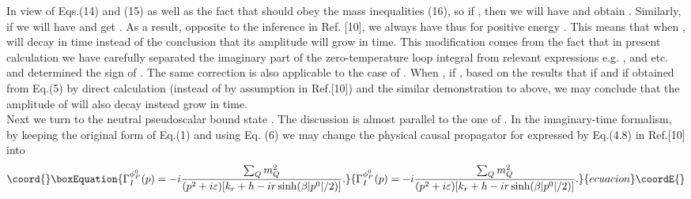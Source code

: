 \documentclass[twocolumn,prd,showpacs,a4paper]{revtex4}
\begin{document}
In view of Eqs.(14) and (15) as well as the fact that \coordHE{} should
obey the mass inequalities (16), so if \coordHE{}, then we will have 
\coordHE{} and obtain \coordHE{}. 
Similarly, if \coordHE{} we will have \coordHE{} and get
\coordHE{}. As a result, opposite to 
the inference in Ref. [10], we always have \coordHE{} thus \coordHE{} for positive 
energy \coordHE{}. This means that when  \coordHE{}, \coordHE{} will 
decay in time instead of the conclusion that its amplitude will grow in time. This 
modification comes from the fact that in present calculation we have carefully 
separated the imaginary part \coordHE{} of the zero-temperature loop integral from 
relevant expressions  e.g. \coordHE{}, \coordHE{} and \coordHE{} etc. and determined the 
sign of \coordHE{}. The same correction is also applicable to the case of \coordHE{}.
When \coordHE{}, if \coordHE{}, based on the results that if \coordHE{}  \coordHE{} 
and if \coordHE{}  \coordHE{} obtained from Eq.(5) by direct calculation 
(instead of \coordHE{} by assumption in Ref.[10]) and the similar demonstration to 
above, we may conclude that the amplitude of \coordHE{} will also decay instead grow 
in time. \\
\indent Next we turn to the neutral pseudoscalar bound state \coordHE{}. The 
discussion is almost parallel to the one of \coordHE{}. In the imaginary-time 
formalism, by keeping the original form of Eq.(1) and using Eq. (6) we may change 
the physical causal propagator for \coordHE{} expressed by Eq.(4.8) in Ref.[10] into  
\begin{equation}\coord{}\boxEquation{
\Gamma_I^{\phi_P^0}(p)
 =-i\frac{\sum_{Q}m_Q^2}{(p^2+i\varepsilon) [k_r+h-ir\sinh(\beta|p^0|/2)]}.
}{
\Gamma_I^{\phi_P^0}(p)
 =-i\frac{\sum_{Q}m_Q^2}{(p^2+i\varepsilon) [k_r+h-ir\sinh(\beta|p^0|/2)]}.
}{ecuacion}\coordE{}\end{equation}%
\end{document}
